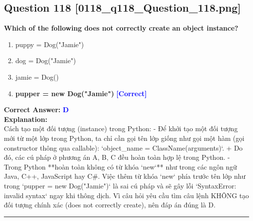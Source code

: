 \documentclass[11pt,a4paper]{article}
\begin{document}
\begin{minipage}{\textwidth}
\subsection*{Question 118 \quad \footnotesize{[0118_q118_Question_118.png]}}
\noindent \textbf{Which of the following does not correctly create an object instance?}

\begin{enumerate}[label=\Alph*.]
    \item puppy = Dog("Jamie")
    \item dog = Dog("Jamie")
    \item jamie = Dog()
    \item \textbf{pupper = new Dog("Jamie")} \hfill \textcolor{blue}{\textbf{[Correct]}}
\end{enumerate}

\noindent \textbf{Correct Answer:} \textcolor{blue}{\textbf{D}} \\[4pt]
\noindent \textbf{Explanation:}\\
Cách tạo một đối tượng (instance) trong Python:\newline
- Để khởi tạo một đối tượng mới từ một lớp trong Python, ta chỉ cần gọi tên lớp giống như gọi một hàm (gọi constructor thông qua callable): `object_name = ClassName(arguments)`.\newline
  + Do đó, các cú pháp ở phương án A, B, C đều hoàn toàn hợp lệ trong Python.\newline
- Trong Python **hoàn toàn không có từ khóa `new`** như trong các ngôn ngữ Java, C++, JavaScript hay C#. Việc thêm từ khóa `new` phía trước tên lớp như trong `pupper = new Dog("Jamie")` là sai cú pháp và sẽ gây lỗi `SyntaxError: invalid syntax` ngay khi thông dịch.\newline
Vì câu hỏi yêu cầu tìm câu lệnh KHÔNG tạo đối tượng chính xác (does not correctly create), nên đáp án đúng là D.
\end{minipage}
\vspace{0.8cm}
\hrule
\vspace{0.5cm}
\end{document}

